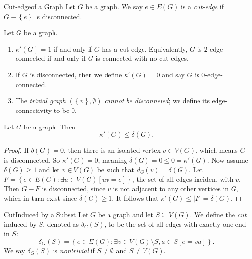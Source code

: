 \documentclass[co342]{subfiles}
\begin{document}
    \begin{definition}{Cut-edge}{of a Graph}
        Let $G$ be a graph. We say $e\in E\left( G \right)$ is a \emph{cut-edge} if $G-\left\lbrace e \right\rbrace$ is disconnected.
    \end{definition}

    \np Let $G$ be a graph.
    \begin{enumerate}
        \item $\kappa'\left( G \right) = 1$ if and only if $G$ has a cut-edge. Equivalently, $G$ is $2$-edge connected if and only if $G$ is connected with no cut-edges.
        \item If $G$ is disconnected, then we define $\kappa'\left( G \right) = 0$ and say $G$ is $0$-edge-connected.
        \item The \emph{trivial graph} $\left( \left\lbrace v \right\rbrace , \emptyset \right)$ \textit{cannot be disconneted}; we define its edge-connectivity to be $0$.
    \end{enumerate}

    \clearpage
    \begin{prop}{}
        Let $G$ be a graph. Then
        \begin{equation*}
            \kappa'\left( G \right) \leq \delta\left( G \right) .
        \end{equation*}
    \end{prop}

    \begin{proof}
        If $\delta\left( G \right) = 0$, then there is an isolated vertex $v\in V\left( G \right)$, which means $G$ is disconnected. So $\kappa'\left( G \right) = 0$, meaning $\delta\left( G \right) = 0 \leq 0 = \kappa'\left( G \right)$. Now assume $\delta\left( G \right) \geq 1$ and let $v\in V\left( G \right)$ be such that $d_G\left( v \right) = \delta\left( G \right) $. Let $F = \left\lbrace e\in E\left( G \right) : \exists u\in V\left( G \right) \left[ uv=e \right]  \right\rbrace$, the set of all edges incident with $v$. Then $G-F$ is disconnected, since $v$ is not adjacent to any other vertices in $G$, which in turn exist since $\delta\left( G \right) \geq 1$. It follows that $\kappa'\left( G \right) \leq \left| F \right| = \delta\left( G \right) $. 
    \end{proof}

    \begin{definition}{Cut}{Induced by a Subset}
        Let $G$ be a graph and let $S\subseteq V\left( G \right)$. We define the \emph{cut} induced by $S$, denoted as $\delta_G\left( S \right)$, to be the set of all edges with exactly one end in $S$:
        \begin{equation*}
            \delta_G\left( S \right) = \left\lbrace e\in E\left( G \right) : \exists v\in V\left( G \right) \setminus S, u\in S\left[ e=vu \right]  \right\rbrace .
        \end{equation*}
        We say $\delta_G\left( S \right)$ is \emph{nontrivial} if $S\neq\emptyset$ and $S\neq V\left( G \right)$.
    \end{definition}
\end{document}
